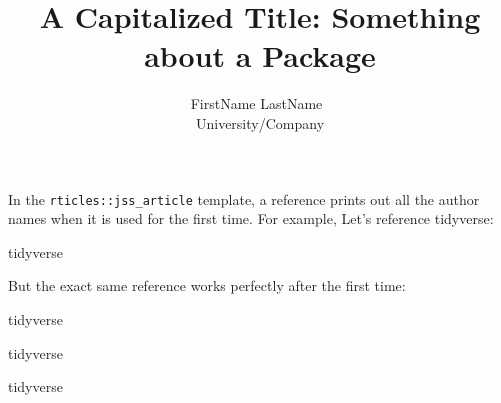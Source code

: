 \documentclass[
]{jss}
\author{
FirstName LastName~\orcidlink{0000-0000-0000-0000}\\University/Company
}
\title{A Capitalized Title: Something about a Package \pkg{foo}}
\begin{document}
In the \texttt{rticles::jss\_article} template, a reference prints out
all the author names when it is used for the first time. For example,
Let's reference tidyverse:

tidyverse \citep{tidyverse}

But the exact same reference works perfectly after the first time:

tidyverse \citep{tidyverse}

tidyverse \citep{tidyverse}

tidyverse \citep{tidyverse}


\end{document}
